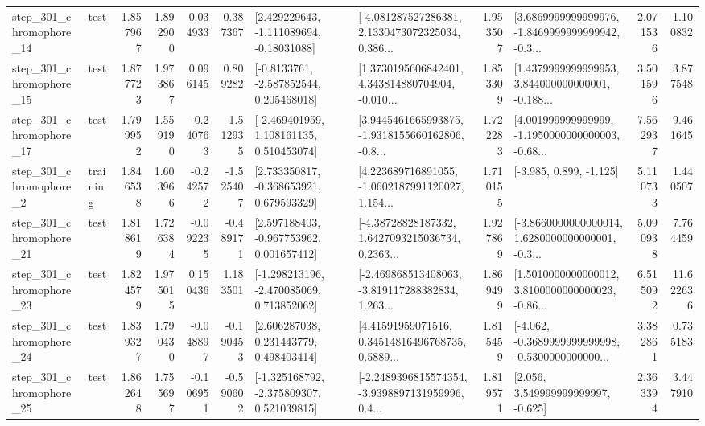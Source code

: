 \begin{tabular}{llrrrrllrlrr}
  step\_301\_chromophore\_14 &      test &      1.857967 &    1.892900 &      0.034933 &  0.387367 &    [2.429229643, -1.111089694, -0.18031088] &  [-4.081287527286381, 2.1330473072325034, 0.386... &       1.953507 &  [3.6869999999999976, -1.8469999999999942, -0.3... &            2.071536 &          1.100832 \\
  step\_301\_chromophore\_15 &      test &      1.877723 &    1.973867 &      0.096145 &  0.809282 &     [-0.8133761, -2.587852544, 0.205468018] &  [1.3730195606842401, 4.343814880704904, -0.010... &       1.853309 &  [1.4379999999999953, 3.844000000000001, -0.188... &            3.501596 &          3.877548 \\
  step\_301\_chromophore\_17 &      test &      1.799952 &    1.559190 &     -0.240763 & -1.512935 &    [-2.469401959, 1.108161135, 0.510453074] &  [3.9445461665993875, -1.9318155660162806, -0.8... &       1.722283 &  [4.001999999999999, -1.1950000000000003, -0.68... &            7.562937 &          9.461645 \\
   step\_301\_chromophore\_2 &  training &      1.846538 &    1.603966 &     -0.242572 & -1.525407 &    [2.733350817, -0.368653921, 0.679593329] &  [4.223689716891055, -1.0602187991120027, 1.154... &       1.710155 &                            [-3.985, 0.899, -1.125] &            5.110733 &          1.440507 \\
  step\_301\_chromophore\_21 &      test &      1.818619 &    1.726384 &     -0.092235 & -0.489171 &    [2.597188403, -0.967753962, 0.001657412] &  [-4.38728828187332, 1.6427093215036734, 0.2363... &       1.927869 &  [-3.8660000000000014, 1.6280000000000001, -0.3... &            5.090938 &          7.764459 \\
  step\_301\_chromophore\_23 &      test &      1.824579 &    1.975015 &      0.150436 &  1.183501 &   [-1.298213196, -2.470085069, 0.713852062] &  [-2.469868513408063, -3.819117288382834, 1.263... &       1.869499 &  [1.5010000000000012, 3.8100000000000023, -0.86... &            6.515092 &         11.622636 \\
  step\_301\_chromophore\_24 &      test &      1.839327 &    1.790430 &     -0.048897 & -0.190453 &     [2.606287038, 0.231443779, 0.498403414] &  [4.41591959071516, 0.34514816496768735, 0.5889... &       1.815459 &  [-4.062, -0.3689999999999998, -0.5300000000000... &            3.382861 &          0.735183 \\
  step\_301\_chromophore\_25 &      test &      1.862648 &    1.755697 &     -0.106951 & -0.590602 &   [-1.325168792, -2.375809307, 0.521039815] &  [-2.2489396815574354, -3.9398897131959996, 0.4... &       1.819571 &                 [2.056, 3.549999999999997, -0.625] &            2.363394 &          3.447910 \\

\end{tabular}
